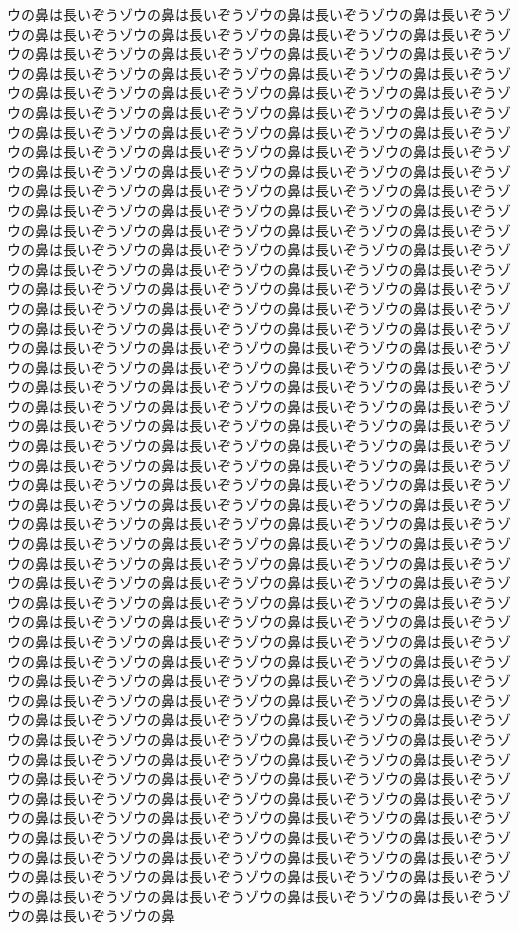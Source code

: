 ウの鼻は長いぞうゾウの鼻は長いぞうゾウの鼻は長いぞうゾウの鼻は長いぞうゾウの鼻は長いぞうゾウの鼻は長いぞうゾウの鼻は長いぞうゾウの鼻は長いぞうゾウの鼻は長いぞうゾウの鼻は長いぞうゾウの鼻は長いぞうゾウの鼻は長いぞうゾウの鼻は長いぞうゾウの鼻は長いぞうゾウの鼻は長いぞうゾウの鼻は長いぞうゾウの鼻は長いぞうゾウの鼻は長いぞうゾウの鼻は長いぞうゾウの鼻は長いぞうゾウの鼻は長いぞうゾウの鼻は長いぞうゾウの鼻は長いぞうゾウの鼻は長いぞうゾウの鼻は長いぞうゾウの鼻は長いぞうゾウの鼻は長いぞうゾウの鼻は長いぞうゾウの鼻は長いぞうゾウの鼻は長いぞうゾウの鼻は長いぞうゾウの鼻は長いぞうゾウの鼻は長いぞうゾウの鼻は長いぞうゾウの鼻は長いぞうゾウの鼻は長いぞうゾウの鼻は長いぞうゾウの鼻は長いぞうゾウの鼻は長いぞうゾウの鼻は長いぞうゾウの鼻は長いぞうゾウの鼻は長いぞうゾウの鼻は長いぞうゾウの鼻は長いぞうゾウの鼻は長いぞうゾウの鼻は長いぞうゾウの鼻は長いぞうゾウの鼻は長いぞうゾウの鼻は長いぞうゾウの鼻は長いぞうゾウの鼻は長いぞうゾウの鼻は長いぞうゾウの鼻は長いぞうゾウの鼻は長いぞうゾウの鼻は長いぞうゾウの鼻は長いぞうゾウの鼻は長いぞうゾウの鼻は長いぞうゾウの鼻は長いぞうゾウの鼻は長いぞうゾウの鼻は長いぞうゾウの鼻は長いぞうゾウの鼻は長いぞうゾウの鼻は長いぞうゾウの鼻は長いぞうゾウの鼻は長いぞうゾウの鼻は長いぞうゾウの鼻は長いぞうゾウの鼻は長いぞうゾウの鼻は長いぞうゾウの鼻は長いぞうゾウの鼻は長いぞうゾウの鼻は長いぞうゾウの鼻は長いぞうゾウの鼻は長いぞうゾウの鼻は長いぞうゾウの鼻は長いぞうゾウの鼻は長いぞうゾウの鼻は長いぞうゾウの鼻は長いぞうゾウの鼻は長いぞうゾウの鼻は長いぞうゾウの鼻は長いぞうゾウの鼻は長いぞうゾウの鼻は長いぞうゾウの鼻は長いぞうゾウの鼻は長いぞうゾウの鼻は長いぞうゾウの鼻は長いぞうゾウの鼻は長いぞうゾウの鼻は長いぞうゾウの鼻は長いぞうゾウの鼻は長いぞうゾウの鼻は長いぞうゾウの鼻は長いぞうゾウの鼻は長いぞうゾウの鼻は長いぞうゾウの鼻は長いぞうゾウの鼻は長いぞうゾウの鼻は長いぞうゾウの鼻は長いぞうゾウの鼻は長いぞうゾウの鼻は長いぞうゾウの鼻は長いぞうゾウの鼻は長いぞうゾウの鼻は長いぞうゾウの鼻は長いぞうゾウの鼻は長いぞうゾウの鼻は長いぞうゾウの鼻は長いぞうゾウの鼻は長いぞうゾウの鼻は長いぞうゾウの鼻は長いぞうゾウの鼻は長いぞうゾウの鼻は長いぞうゾウの鼻は長いぞうゾウの鼻は長いぞうゾウの鼻は長いぞうゾウの鼻は長いぞうゾウの鼻は長いぞうゾウの鼻は長いぞうゾウの鼻は長いぞうゾウの鼻は長いぞうゾウの鼻は長いぞうゾウの鼻は長いぞうゾウの鼻は長いぞうゾウの鼻は長いぞうゾウの鼻は長いぞうゾウの鼻は長いぞうゾウの鼻は長いぞうゾウの鼻は長いぞうゾウの鼻は長いぞうゾウの鼻は長いぞうゾウの鼻は長いぞうゾウの鼻は長いぞうゾウの鼻は長いぞうゾウの鼻は長いぞうゾウの鼻は長いぞうゾウの鼻は長いぞうゾウの鼻は長いぞうゾウの鼻は長いぞうゾウの鼻は長いぞうゾウの鼻は長いぞうゾウの鼻は長いぞうゾウの鼻は長いぞうゾウの鼻は長いぞうゾウの鼻は長いぞうゾウの鼻は長いぞうゾウの鼻は長いぞうゾウの鼻は長いぞうゾウの鼻は長いぞうゾウの鼻は長いぞうゾウの鼻は長いぞうゾウの鼻は長いぞうゾウの鼻は長いぞうゾウの鼻は長いぞうゾウの鼻は長いぞうゾウの鼻は長いぞうゾウの鼻は長いぞうゾウの鼻は長いぞうゾウの鼻は長いぞうゾウの鼻は長いぞうゾウの鼻は長いぞうゾウの鼻は長いぞうゾウの鼻は長いぞうゾウの鼻は長いぞうゾウの鼻は長いぞうゾウの鼻は長いぞうゾウの鼻は長いぞうゾウの鼻は長いぞうゾウの鼻は長いぞうゾウの鼻は長いぞうゾウの鼻は長いぞうゾウの鼻は長いぞうゾウの鼻は長いぞうゾウの鼻は長いぞうゾウの鼻は長いぞうゾウの鼻は長いぞうゾウの鼻は長いぞうゾウの鼻は長いぞうゾウの鼻は長いぞうゾウの鼻は長いぞうゾウの鼻は長いぞうゾウの鼻は長いぞうゾウの鼻は長いぞうゾウの鼻